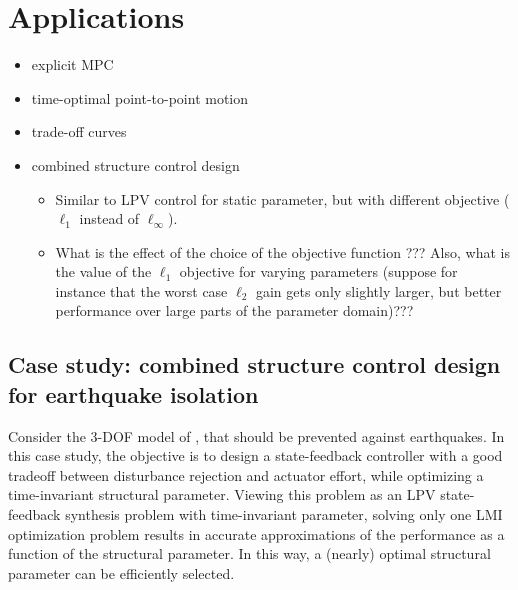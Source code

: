 \documentclass{article}
\begin{document}

\section{Applications}

\begin{itemize}
\item explicit MPC
\item time-optimal point-to-point motion
\item trade-off curves
\item combined structure control design
    \begin{itemize}
    \item Similar to LPV control for static parameter, but with different objective ($\ell_1$ instead of $\ell_\infty$).
    \item What is the effect of the choice of the objective function ??? Also, what is the value of the $\ell_1$ objective for varying parameters (suppose for instance that the worst case $\ell_2$ gain gets only slightly larger, but better performance over large parts of the parameter domain)???
    \end{itemize}
\end{itemize}

\subsection{Case study: combined structure control design for earthquake isolation}
Consider the 3-DOF model of \cite{Camino_2003}, that should be prevented against earthquakes. In this case study, the objective is to design a state-feedback controller with a good tradeoff between disturbance rejection and actuator effort, while optimizing a time-invariant structural parameter. Viewing this problem as an LPV state-feedback synthesis problem with time-invariant parameter, solving only one LMI optimization problem results in accurate approximations of the performance as a function of the structural parameter. In this way, a (nearly) optimal structural parameter can be efficiently selected.
\end{document}
